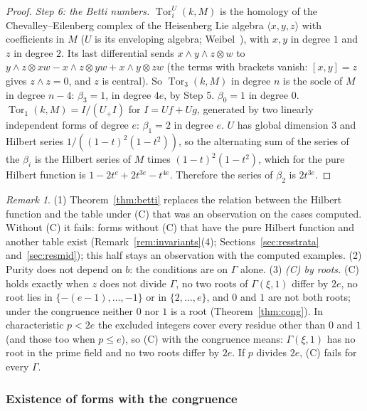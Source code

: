 \documentclass[11pt]{article}
\theoremstyle{definition}
\theoremstyle{remark}
\newtheorem{remark}{Remark}
\newcommand{\Tor}{\operatorname{Tor}}
\begin{document}
\begin{proof}
\emph{Step 6: the Betti numbers.} $\Tor^U_i(k,M)$ is the homology of the Chevalley--Eilenberg complex of the Heisenberg Lie algebra $\langle x,y,z\rangle$ with coefficients in $M$ ($U$ is its enveloping algebra; Weibel~\cite[Section~7.7]{Weibel}), with $x,y$ in degree $1$ and $z$ in degree $2$. Its last differential sends $x\wedge y\wedge z\otimes w$ to $y\wedge z\otimes xw-x\wedge z\otimes yw+x\wedge y\otimes zw$ (the terms with brackets vanish: $[x,y]=z$ gives $z\wedge z=0$, and $z$ is central). So $\Tor_3(k,M)$ in degree $n$ is the socle of $M$ in degree $n-4$: $\beta_3=1$, in degree $4e$, by Step 5. $\beta_0=1$ in degree $0$. $\Tor_1(k,M)=I/(U_+I)$ for $I=Uf+Ug$, generated by two linearly independent forms of degree $e$: $\beta_1=2$ in degree $e$. $U$ has global dimension $3$ and Hilbert series $1/((1-t)^2(1-t^2))$, so the alternating sum of the series of the $\beta_i$ is the Hilbert series of $M$ times $(1-t)^2(1-t^2)$, which for the pure Hilbert function is $1-2t^e+2t^{3e}-t^{4e}$. Therefore the series of $\beta_2$ is $2t^{3e}$.
\end{proof}

\begin{remark}\label{rem:betti}
(1) Theorem~\ref{thm:betti} replaces the relation between the Hilbert function and the table under (C) that was an observation on the cases computed. Without (C) it fails: forms without (C) that have the pure Hilbert function and another table exist (Remark~\ref{rem:invariants}(4); Sections~\ref{sec:resstrata} and~\ref{sec:resmid}); this half stays an observation with the computed examples. (2) Purity does not depend on $b$: the conditions are on $\Gamma$ alone. (3) \emph{(C) by roots.} (C) holds exactly when $z$ does not divide $\Gamma$, no two roots of $\Gamma(\xi,1)$ differ by $2e$, no root lies in $\{-(e-1),\dots,-1\}$ or in $\{2,\dots,e\}$, and $0$ and $1$ are not both roots; under the congruence neither $0$ nor $1$ is a root (Theorem~\ref{thm:cong}). In characteristic $p<2e$ the excluded integers cover every residue other than $0$ and $1$ (and those too when $p\le e$), so (C) with the congruence means: $\Gamma(\xi,1)$ has no root in the prime field and no two roots differ by $2e$. If $p$ divides $2e$, (C) fails for every $\Gamma$.
\end{remark}

\subsubsection*{Existence of forms with the congruence}
\end{document}
